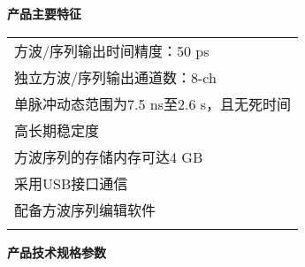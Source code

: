 \makeatletter
\def\hlinewd#1{%
  \noalign{\ifnum0=`}\fi\hrule \@height #1 \futurelet
   \reserved@a\@xhline}
\makeatother
\noindent\sanhao\textbf{产品主要特征}
\vspace{0.3cm}
\song
\begin{table}[H]
\normalsize
{}
\begin{tabular}{m{13.5cm}}
\rowcolor{gray!20}
\arrayrulecolor{tabcolor_top}\toprule[1.8pt]
方波/序列输出时间精度：50 ps\\\arrayrulecolor{tabcolor}\midrule[1.2pt]
独立方波/序列输出通道数：8-ch \\\arrayrulecolor{tabcolor}\midrule[1.2pt]
单脉冲动态范围为7.5 ns至2.6 s，且无死时间\\\arrayrulecolor{tabcolor}\midrule[1.2pt]
高长期稳定度\\\arrayrulecolor{tabcolor}\midrule[1.2pt]
方波序列的存储内存可达4 GB\\\arrayrulecolor{tabcolor}\midrule[1.2pt]
采用USB接口通信\\\arrayrulecolor{tabcolor}\midrule[1.2pt]
配备方波序列编辑软件\\
\arrayrulecolor{tabcolor_top}\bottomrule[1.8pt]
\end{tabular}
\end{table}


\newpage
\noindent\sanhao\textbf{产品技术规格参数}
\vspace{0.5cm}

